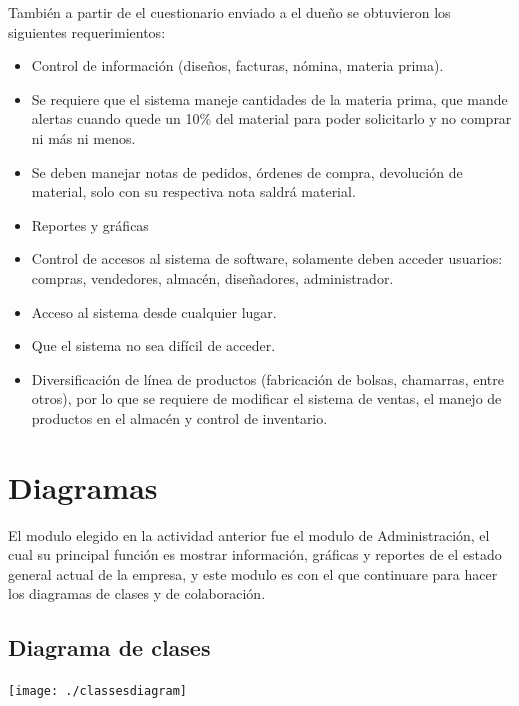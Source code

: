 \documentclass[spanish,12pt,letterpapper]{article}
\begin{document}
	También a partir de el cuestionario enviado a el dueño se obtuvieron los siguientes requerimientos:
	
	\begin{itemize}
	\item Control de información (diseños, facturas, nómina, materia prima).
	\item Se requiere que el sistema maneje cantidades de la materia prima, que mande alertas cuando quede un 10\% del material para poder solicitarlo y no comprar ni más ni menos.
	\item Se deben manejar notas de pedidos, órdenes de compra, devolución de material, solo con su respectiva nota saldrá material.
	\item Reportes y gráficas
	\item Control de accesos al sistema de software, solamente deben acceder usuarios: compras, vendedores, almacén, diseñadores, administrador.
	\item Acceso al sistema desde cualquier lugar.
	\item Que el sistema no sea difícil de acceder.
	\item Diversificación de línea de productos (fabricación de bolsas, chamarras, entre otros), por lo que se requiere de modificar el sistema de ventas, el manejo de productos en el almacén y control de inventario.
	\end{itemize}
	
	\section{Diagramas}
	El modulo elegido en la actividad anterior fue el modulo de Administración, el cual su principal función es mostrar información, gráficas y reportes de el estado general actual de la empresa, y este modulo es con el que continuare para hacer los diagramas de clases y de colaboración.
	
	
	\subsection{Diagrama de clases}
	\begin{center}
	\texttt{[image: ./classesdiagram]}~\\[1cm] 
	\end{center}
	
\end{document}
